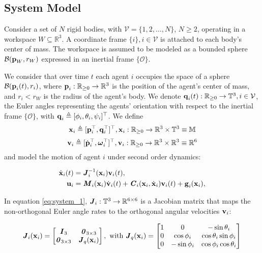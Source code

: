 \subsection{System Model}

Consider a set of $N$ rigid bodies, with $\mathcal{V} = \{ 1,2, \ldots, N\}$,
$N  \geq 2$, operating in a workspace $W\subseteq \mathbb{R}^3$.
A coordinate frame $\{i\}, i\in\mathcal{V}$ is attached to each body's
center of mass. The workspace is assumed to be modeled as a
bounded sphere $\mathcal{B}(\bm{\mathbf{p}}_W,r_W)$ expressed in an inertial frame
$\{\mathcal{O}\}$.

We consider that over time $t$ each agent $i$ occupies the space of a sphere
$\mathcal{B}(\bm{\mathbf{p}}_i(t), r_i)$, where $\bm{\mathbf{p}}_i : \mathbb{R}_{\geq 0} \to \mathbb{R}^3$
is the position of the agent's center of mass, and $r_i < r_W$ is the radius of the
agent's body. We denote $\bm{\mathbf{q}}_i(t):\mathbb{R}_{\geq 0} \to \mathbb{T}^3, i\in\mathcal{V}$,
the Euler angles representing the agents' orientation with respect to the
inertial frame $\{\mathcal{O}\}$,
with $\bm{\mathbf{q}}_i \triangleq [\phi_i,\theta_i,\psi_i]^{\top}$.
We define
$$\bm{\mathbf{x}}_i \triangleq [\bm{\mathbf{p}}^{\top}_i,\bm{\mathbf{q}}^{\top}_i]^{\top},
\bm{\mathbf{x}}_i:\mathbb{R}_{\geq 0} \to \mathbb{R}^3\times \mathbb{T}^3 \equiv \mathbb{M}$$
$$\bm{\mathbf{v}}_i \triangleq [\dot{\bm{\mathbf{p}}}^{\top}_i, \bm{\mathbf{\omega}}^{\top}_i]^{\top},
\bm{\mathbf{v}}_i : \mathbb{R}_{\geq 0} \to \mathbb{R}^3\times \mathbb{R}^3 \equiv \mathbb{R}^6$$
and model the motion of agent $i$ under second order dynamics:

\begin{subequations}
	\begin{align}
    \dot{\bm{\mathbf{x}}}_i(t) &= \bm{\mathit{J}}_i^{-1}(\bm{\mathbf{x}}_i) \bm{\mathbf{v}}_i(t), \label{eq:system_1} \\
    \bm{\mathbf{u}}_i &= \bm{\mathit{M}}_i(\bm{\mathbf{x}}_i) \dot{\bm{\mathbf{v}}}_i(t) + \bm{\mathit{C}}_i(\bm{\mathbf{x}}_i,\dot{\bm{\mathbf{x}}}_i) \bm{\mathbf{v}}_i(t)+\bm{\mathbf{g}}_i(\bm{\mathbf{x}}_i), \label{eq:system_2}
	\end{align}
  \label{eq:system}
\end{subequations}

In equation \eqref{eq:system_1}, $\bm{\mathit{J}}_i:\mathbb{T}^3 \to \mathbb{R}^{6\times6}$ is
a Jacobian matrix that maps the non-orthogonal Euler angle rates to the
orthogonal angular velocities $\bm{\mathbf{v}}_i$:

\begin{equation}
  \bm{\mathit{J}}_i(\bm{\mathbf{x}}_i) =
  \begin{bmatrix}
    \bm{\mathit{I}}_3 & \bm{\mathit{0}}_{3 \times 3} \\
    \bm{\mathit{0}}_{3 \times 3} & \bm{\mathit{J}}_{ q }(\bm{\mathbf{x}}_i) \\
  \end{bmatrix} \notag, \text{ with }
  \bm{\mathit{J}}_q(\bm{\mathbf{x}}_i) =
  \begin{bmatrix}
    1 & 0 & -\sin\theta_i \\
    0 & \cos\phi_i & \cos\theta_i \sin\phi_i \\
    0 & - \sin\phi_i & \cos\phi_i \cos\theta_i
  \end{bmatrix} \notag
\end{equation}

